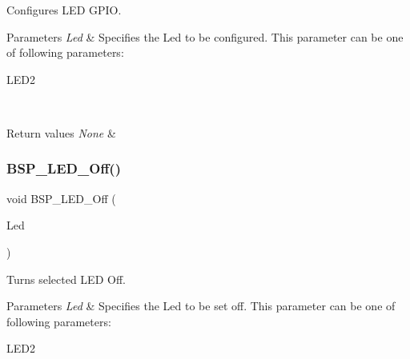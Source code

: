 Configures L\+ED G\+P\+IO. 


\begin{DoxyParams}{Parameters}
{\em Led} & Specifies the Led to be configured. This parameter can be one of following parameters\+: \begin{DoxyItemize}
\item L\+E\+D2 \end{DoxyItemize}
\\
\hline
\end{DoxyParams}

\begin{DoxyRetVals}{Return values}
{\em None} & \\
\hline
\end{DoxyRetVals}
\mbox{\label{group__B-L072Z-LRWAN1__LOW__LEVEL__Private__Defines_gaef268680154ca15c45066d64d41f9467}} 
\subsubsection{\texorpdfstring{B\+S\+P\+\_\+\+L\+E\+D\+\_\+\+Off()}{BSP\_LED\_Off()}}
{\footnotesize\ttfamily void B\+S\+P\+\_\+\+L\+E\+D\+\_\+\+Off (\begin{DoxyParamCaption}\item[{\hyperlink{group__B-L072Z-LRWAN1__LOW__LEVEL__Exported__Types_gaa059704b7ca945eb9c1e7f2c3d03fecd}{Led\+\_\+\+Type\+Def}}]{Led }\end{DoxyParamCaption})}



Turns selected L\+ED Off. 


\begin{DoxyParams}{Parameters}
{\em Led} & Specifies the Led to be set off. This parameter can be one of following parameters\+: \begin{DoxyItemize}
\item L\+E\+D2 \end{DoxyItemize}
\\
\hline
\end{DoxyParams}

